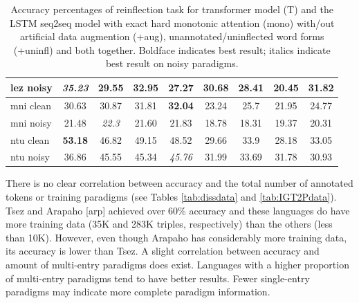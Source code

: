 \begin{table}
\begin{tabular}{l|cccc|cccc}
      lez noisy & \textit{35.23} & 29.55 & 32.95 & 27.27          & 30.68 & 28.41 & 20.45 & 31.82 \\
      \hline
      mni clean & 30.63 & 30.87         & 31.81 & \textbf{32.04} & 23.24 & 25.7 & 21.95 & 24.77 \\
      mni noisy & 21.48 & \textit{22.3} & 21.60 & 21.83          & 18.78 & 18.31 & 19.37 & 20.31 \\
      \hline
      ntu clean & \textbf{53.18} & 46.82 & 49.15 & 48.52          & 29.66 & 33.9 & 28.18 & 33.05 \\
      ntu noisy & 36.86          & 45.55 & 45.34 & \textit{45.76} & 31.99 & 33.69 & 31.78 & 30.93 \\
    \end{tabular}
    \caption[IGT2P Results]{Accuracy percentages of reinflection task for transformer model (T) and the LSTM seq2seq model with exact hard monotonic attention (mono) with/out artificial data augmention (+aug), unannotated/uninflected word forms (+uninfl) and both together. Boldface indicates best result; italics indicate best result on noisy paradigms.}
    \label{tab:IGT2Presults}
\end{table}

There is no clear correlation between accuracy and the total number of annotated tokens or training paradigms (see Tables \ref{tab:dissdata} and \ref{tab:IGT2Pdata}). Tsez and Arapaho [arp] achieved over 60\% accuracy and these languages do have more training data (35K and 283K triples, respectively) than the others (less than 10K). However, even though Arapaho has considerably more training data, its accuracy is lower than Tsez. A slight correlation between accuracy and amount of multi-entry paradigms does exist. Languages with a higher proportion of multi-entry paradigms tend to have better results. Fewer single-entry paradigms may indicate more complete paradigm information.

